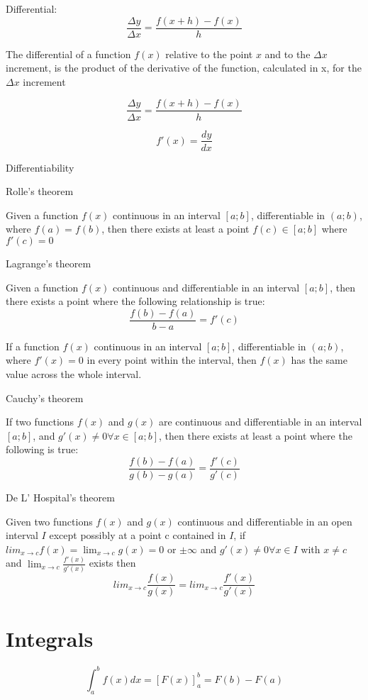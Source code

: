 \documentclass{article}
\begin{document}
Differential:
\begin{equation}
\frac{\Delta y}{\Delta x} = \frac{f(x+h)-f(x)}{h}
\end{equation}

The differential of a function $f(x)$ relative to the point $x$ and to the $\Delta x$ increment, is the product of the derivative of the function, calculated in x, for the $\Delta x$ increment

\begin{equation}
\frac{\Delta y}{\Delta x} = \frac{f(x+h)-f(x)}{h}
\end{equation}

\begin{equation}
f'(x) = \frac{dy}{dx}
\end{equation}

Differentiability


Rolle's theorem

Given a function $f(x)$ continuous in an interval $[a;b]$, differentiable in $(a; b)$, where $f(a) = f(b)$, then there exists at least a point $f(c) \in [a; b]$ where $f'(c) = 0$

Lagrange's theorem

Given a function $f(x)$ continuous and differentiable in an interval $[a;b]$, then there exists a point where the following relationship is true:
\begin{equation}
\frac{f(b)-f(a)}{b-a} = f'(c)
\end{equation}

If a function $f(x)$ continuous in an interval $[a;b]$, differentiable in $(a; b)$, where $f'(x) = 0$ in every point within the interval, then $f(x)$ has the same value across the whole interval.

Cauchy's theorem

If two functions $f(x)$ and $g(x)$ are continuous and differentiable in an interval $[a;b]$, and $g'(x)\neq 0 \forall x \in [a;b]$, then there exists at least a point where the following is true:
\begin{equation}
\frac{f(b)-f(a)}{g(b)-g(a)} = \frac{f'(c)}{g'(c)}
\end{equation}

De L' Hospital's theorem

Given two functions $f(x)$ and $g(x)$ continuous and differentiable in an open interval $I$ except possibly at a point c contained in $I$, if $lim_{x\to c} f(x) = \lim_{x\to c} g(x) = 0$ or $\pm\infty$ and $g'(x)\neq 0 \forall x \in I$ with $x\neq c$ and $\lim_{x\to c} \frac{f'(x)}{g'(x)}$ exists then
\begin{equation}
lim_{x\to c}\frac{f(x)}{g(x)} = lim_{x\to c}\frac{f'(x)}{g'(x)}
\end{equation}

\section{Integrals}

\begin{equation}
\int_{a}^{b} f(x) dx = [F(x)]_{a}^{b} = F(b) - F(a)
\end{equation}
\end{document}
